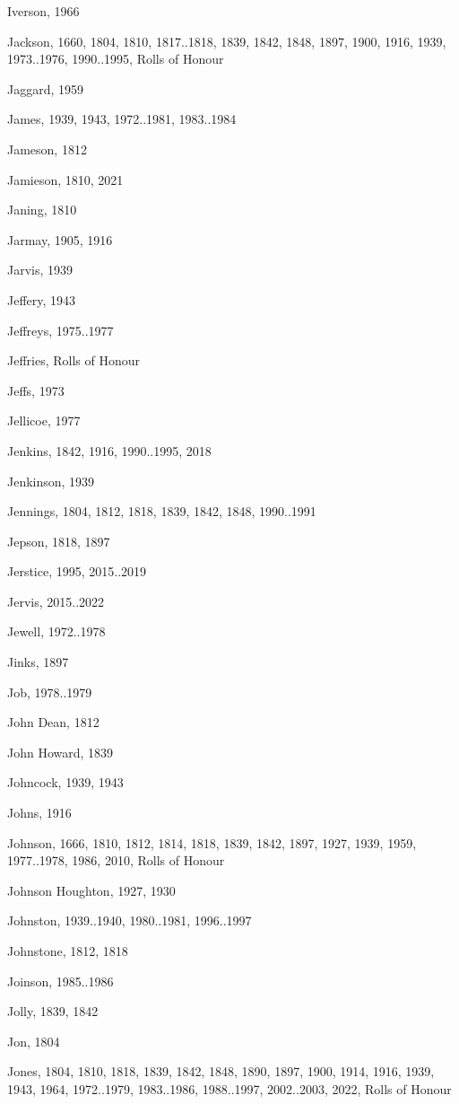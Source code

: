 \begin{theindex}
\item Iverson, 1966
\item Jackson, 1660, 1804, 1810, 1817..1818, 1839, 1842, 1848, 1897, 1900, 1916, 1939, 1973..1976, 1990..1995, Rolls of Honour
\item Jaggard, 1959
\item James, 1939, 1943, 1972..1981, 1983..1984
\item Jameson, 1812
\item Jamieson, 1810, 2021
\item Janing, 1810
\item Jarmay, 1905, 1916
\item Jarvis, 1939
\item Jeffery, 1943
\item Jeffreys, 1975..1977
\item Jeffries, Rolls of Honour
\item Jeffs, 1973
\item Jellicoe, 1977
\item Jenkins, 1842, 1916, 1990..1995, 2018
\item Jenkinson, 1939
\item Jennings, 1804, 1812, 1818, 1839, 1842, 1848, 1990..1991
\item Jepson, 1818, 1897
\item Jerstice, 1995, 2015..2019
\item Jervis, 2015..2022
\item Jewell, 1972..1978
\item Jinks, 1897
\item Job, 1978..1979
\item John Dean, 1812
\item John Howard, 1839
\item Johncock, 1939, 1943
\item Johns, 1916
\item Johnson, 1666, 1810, 1812, 1814, 1818, 1839, 1842, 1897, 1927, 1939, 1959, 1977..1978, 1986, 2010, Rolls of Honour
\item Johnson Houghton, 1927, 1930
\item Johnston, 1939..1940, 1980..1981, 1996..1997
\item Johnstone, 1812, 1818
\item Joinson, 1985..1986
\item Jolly, 1839, 1842
\item Jon, 1804
\item Jones, 1804, 1810, 1818, 1839, 1842, 1848, 1890, 1897, 1900, 1914, 1916, 1939, 1943, 1964, 1972..1979, 1983..1986, 1988..1997, 2002..2003, 2022, Rolls of Honour

\end{theindex}

